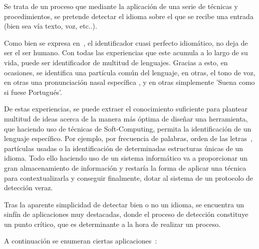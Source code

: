 \documentclass[runningheads,a4paper]{llncs}
\theoremstyle{break}
\begin{document}
Se trata de un proceso que mediante la aplicación de una serie de técnicas y procedimientos, se pretende detectar el idioma sobre el que se recibe una entrada (bien sea vía texto, voz, etc..).

Como bien se expresa en~\cite{lid:1}, el identificador cuasi perfecto idiomático, no deja de ser el ser humano. Con todas las experiencias que este acumula a lo largo de su vida, puede ser identificador de multitud de lenguajes. Gracias a esto, en ocasiones, se identifica una partícula común del lenguaje, en otras, el tono de voz, en otras una pronunciación nasal específica \cite{lid:1}, y en otras simplemente 'Suena como si fuese Portugués'.

De estas experiencias, se puede extraer el conocimiento suficiente para plantear multitud de ideas acerca de la manera más óptima de diseñar una herramienta, que haciendo uso de técnicas de Soft-Computing, permita la identificación de un lenguaje específico. Por ejemplo, por frecuencia de palabras, orden de las letras~\cite{lid:2}, partículas usadas o la identificación de determinadas estructuras únicas de un idioma. Todo ello haciendo uso de un sistema informático va a proporcionar un gran almacenamiento de información y restaría la forma de aplicar una técnica para contextualizarla y conseguir finalmente, dotar al sistema de un protocolo de detección veraz.

Tras la aparente simplicidad de detectar bien o no un idioma, se encuentra un sinfín de aplicaciones muy destacadas, donde el proceso de detección constituye un punto crítico, que es determinante a la hora de realizar un proceso. 
	
\pagebreak
A continuación se enumeran ciertas aplicaciones~\cite{lid:1}:
\end{document}
